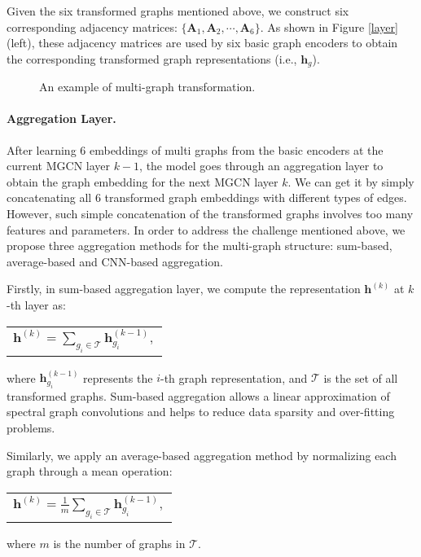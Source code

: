 \documentclass[11pt,a4paper]{article}
\renewcommand{\vec}[1]{\mathbf{#1}} \usepackage{color, colortbl}
\renewcommand{\vec}[1]{\mathbf{#1}}
\begin{document}
Given the six transformed graphs mentioned above, we construct six corresponding adjacency matrices: $\{\mathbf{A}_1, \mathbf{A}_2, \cdots, \mathbf{A}_6\}$. 
As shown in Figure \ref{layer} (left), these adjacency matrices are used by six basic graph encoders to obtain the corresponding transformed graph representations (i.e., $\vec{h}_g$).




\begin{figure*}[t!]
\caption{\label{multigraph} An example of multi-graph transformation.
}
\end{figure*}




\paragraph{Aggregation Layer.}
After learning 6 embeddings of multi graphs from the basic encoders at the current MGCN layer $k-1$, the model goes through an aggregation layer to obtain the graph embedding for the next MGCN layer $k$. 
We can get it by simply concatenating all 6 transformed graph embeddings with different types of edges.
However, such simple concatenation of the transformed graphs involves too many features and parameters.
In order to address the challenge mentioned above, 
we propose three aggregation methods for the multi-graph structure: sum-based, average-based and CNN-based aggregation.




Firstly, in sum-based aggregation layer, we compute the representation $\vec{h}^{(k)}$ at $k$-th layer as:
\begin{center}
\begin{tabular}{c}
		$
		\vec{h}^{(k)} =
		\sum_{{g_i} \in {\mathcal{T}}}
\vec{h}_{g_i}^{(k-1)},
		$
	\end{tabular}
\end{center}
where $\vec{h}_{g_i}^{(k-1)}$ represents the $i$-th graph representation, and $\mathcal{T}$ is the set of all transformed graphs. 
Sum-based aggregation allows a linear approximation of spectral graph convolutions and helps to reduce data sparsity and over-fitting problems.

Similarly, we apply an average-based aggregation method by normalizing each graph through a mean operation:
\begin{center}
\begin{tabular}{c}
		$
		\vec{h}^{(k)} =
		\frac{1}{m}
		\sum_{{g_i} \in {\mathcal{T}}}
\vec{h}_{g_i}^{(k-1)},
		$
	\end{tabular}
\end{center}
where $m$ is the number of graphs in $\mathcal{T}$.
\end{document}
